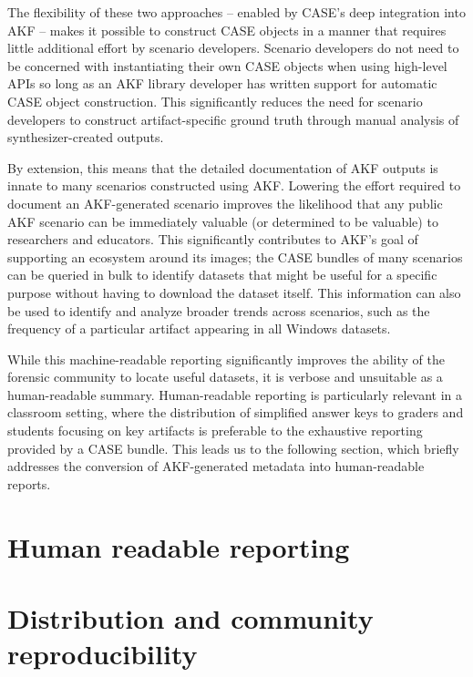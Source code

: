 \documentclass[letterpaper,12pt]{report}
\begin{document}
The flexibility of these two approaches -- enabled by CASE's deep
integration into AKF -- makes it possible to construct CASE objects in a
manner that requires little additional effort by scenario developers.
Scenario developers do not need to be concerned with instantiating their
own CASE objects when using high-level APIs so long as an AKF library
developer has written support for automatic CASE object construction.
This significantly reduces the need for scenario developers to construct
artifact-specific ground truth through manual analysis of
synthesizer-created outputs.

By extension, this means that the detailed documentation of AKF outputs
is innate to many scenarios constructed using AKF. Lowering the effort
required to document an AKF-generated scenario improves the likelihood
that any public AKF scenario can be immediately valuable (or determined
to be valuable) to researchers and educators. This significantly
contributes to AKF's goal of supporting an ecosystem around its images;
the CASE bundles of many scenarios can be queried in bulk to identify
datasets that might be useful for a specific purpose without having to
download the dataset itself. This information can also be used to
identify and analyze broader trends across scenarios, such as the
frequency of a particular artifact appearing in all Windows datasets.

While this machine-readable reporting significantly improves the ability
of the forensic community to locate useful datasets, it is verbose and
unsuitable as a human-readable summary. Human-readable reporting is
particularly relevant in a classroom setting, where the distribution of
simplified answer keys to graders and students focusing on key artifacts
is preferable to the exhaustive reporting provided by a CASE bundle.
This leads us to the following section, which briefly addresses the
conversion of AKF-generated metadata into human-readable reports.

\section{Human readable reporting}\label{human-readable-reporting}

\section{Distribution and community
reproducibility}\label{distribution-and-community-reproducibility}
\end{document}
